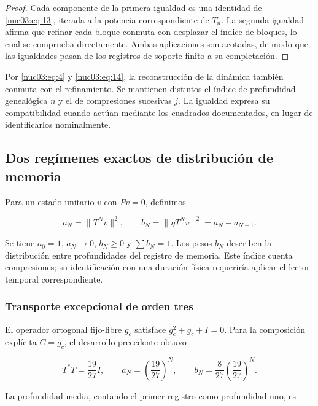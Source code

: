 \begin{proof}
Cada componente de la primera igualdad es una identidad de \eqref{nuc03:eq:13}, iterada a la potencia correspondiente de \(T_n\). La segunda igualdad afirma que refinar cada bloque conmuta con desplazar el índice de bloques, lo cual se comprueba directamente. Ambas aplicaciones son acotadas, de modo que las igualdades pasan de los registros de soporte finito a su completación.
\end{proof}

Por \eqref{nuc03:eq:4} y \eqref{nuc03:eq:14}, la reconstrucción de la dinámica también conmuta con el refinamiento. Se mantienen distintos el índice de profundidad genealógica \(n\) y el de compresiones sucesivas \(j\). La igualdad expresa su compatibilidad cuando actúan mediante los cuadrados documentados, en lugar de identificarlos nominalmente.

\subsection{Dos regímenes exactos de distribución de memoria}

Para un estado unitario \(v\) con \(Pv=0\), definimos

\begin{equation}
a_N=\|T^Nv\|^2,\qquad b_N=\|\eta T^Nv\|^2=a_N-a_{N+1}.
\label{nuc03:eq:15}
\end{equation}

Se tiene \(a_0=1\), \(a_N\to0\), \(b_N\geq0\) y \(\sum b_N=1\). Los pesos \(b_N\) describen la distribución entre profundidades del registro de memoria. Este índice cuenta compresiones; su identificación con una duración física requeriría aplicar el lector temporal correspondiente.

\subsubsection{Transporte excepcional de orden tres}

El operador ortogonal fijo-libre \(g_c\) satisface \(g_c^2+g_c+I=0\). Para la composición explícita \(C=g_c\), el desarrollo precedente obtuvo

\begin{equation}
T^*T=\frac{19}{27}I,
\qquad a_N=\left(\frac{19}{27}\right)^N,
\qquad b_N=\frac8{27}\left(\frac{19}{27}\right)^N.
\label{nuc03:eq:16}
\end{equation}

La profundidad media, contando el primer registro como profundidad uno, es

